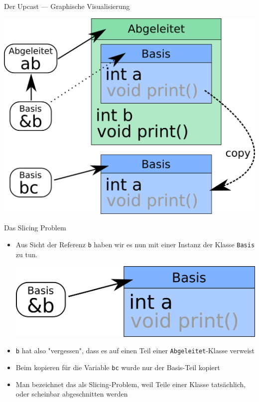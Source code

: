 \documentclass[presentation]{beamer}
\begin{document}
\begin{frame}[label={sec:org9e810f8}]{Der Upcast --- Graphische Visualisierung}
\begin{center}\begin{center}
\includegraphics[width=.9\linewidth]{img/slizing_full.png}
\end{center}\end{center}
\end{frame}
\begin{frame}[fragile,label={sec:org934fcd5}]{Das Slicing Problem}
 \begin{itemize}
\item Aus Sicht der Referenz {\color{solarizedYellow}\texttt{b} }haben wir es nun mit einer Instanz der
Klasse {\color{solarizedYellow}\texttt{Basis} }zu tun.

\begin{center}\begin{center}
\includegraphics[width=.9\linewidth]{img/slizing_small.png}
\end{center}\end{center}
\item {\color{solarizedYellow}\texttt{b} }hat also "vergessen", dass es auf einen Teil einer
{\color{solarizedYellow}\texttt{Abgeleitet}}-Klasse verweist
\item Beim kopieren für die Variable {\color{solarizedYellow}\texttt{bc} }wurde nur der Basis-Teil kopiert
\item Man bezeichnet das als Slicing-Problem, weil Teile einer Klasse
tatsächlich, oder scheinbar abgeschnitten werden
\end{itemize}
\end{frame}
\end{document}
